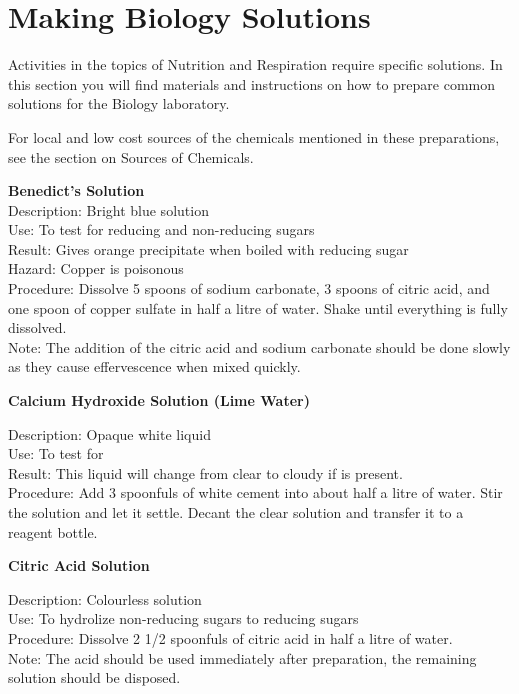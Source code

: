 \chapter{Making Biology Solutions}
Activities in the topics of Nutrition and Respiration require specific solutions. In this section you will find materials and instructions on how to prepare common solutions for the Biology laboratory.

For local and low cost sources of the chemicals mentioned in these preparations, see the section on Sources of Chemicals.

\begin{flushleft}
\textbf{Benedict's Solution}\\
Description: Bright blue solution\\
Use: To test for reducing and non-reducing sugars\\
Result: Gives orange precipitate when boiled with reducing sugar\\
Hazard: Copper is poisonous\\
Procedure: Dissolve 5 spoons of sodium carbonate, 3 spoons of citric acid,
and one spoon of copper sulfate in half a litre of water. Shake until everything is fully dissolved.\\Note: The addition of the citric acid and sodium carbonate should be done slowly as they cause effervescence when mixed quickly.
\end{flushleft}

\begin{flushleft}
\textbf{Calcium Hydroxide Solution (Lime Water)}
\end{flushleft}
\vspace{-10pt}
Description: Opaque white liquid\\
Use: To test for \\
Result: This liquid will change from clear to cloudy if  is present.\\
Procedure: Add 3 spoonfuls of white cement into about half a litre of water. Stir the solution and let it settle. Decant the clear solution and transfer it to a reagent bottle.\\

\begin{flushleft}
\textbf{Citric Acid Solution}
\end{flushleft}
\vspace{-10pt}
Description: Colourless solution\\
Use: To hydrolize non-reducing sugars to reducing sugars\\
Procedure: Dissolve 2 1/2 spoonfuls of citric acid in half a litre of water.\\
Note: The acid should be used immediately after preparation, the remaining solution should be disposed.

